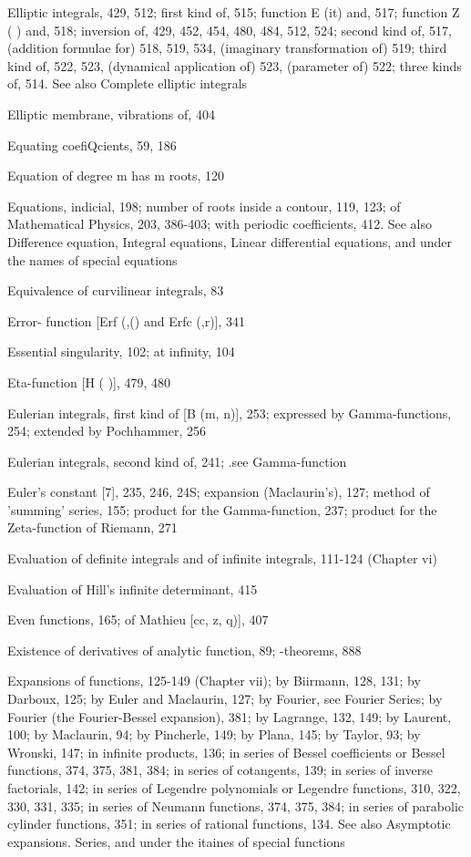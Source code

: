 %
%

Elliptic integrals, 429, 512; first kind of, 515; function E (it) and, 517; function Z ( ) and,
518; inversion of, 429, 452, 454, 480, 484, 512, 524; second kind of, 517, (addition formulae
for) 518, 519, 534, (imaginary transformation of) 519; third kind of, 522, 523, (dynamical
application of) 523, (parameter of) 522; three kinds of, 514. See also Complete elliptic
integrals

Elliptic membrane, vibrations of, 404

Equating coefiQcients, 59, 186

Equation of degree m has m roots, 120

Equations, indicial, 198; number of roots inside a contour, 119, 123; of Mathematical Physics,
203, 386-403; with periodic coefficients, 412. See also Difference equation, Integral
equations, Linear differential equations, and under the names of special equations

Equivalence of curvilinear integrals, 83

Error- function [Erf (,() and Erfc (,r)], 341

Essential singularity, 102; at infinity, 104

Eta-function [H ( )], 479, 480

Eulerian integrals, first kind of [B (m, n)], 253; expressed by Gamma-functions, 254; extended
by Pochhammer, 256

Eulerian integrals, second kind of, 241; .see Gamma-function

Euler's constant [7], 235, 246, 24S; expansion (Maclaurin's), 127; method of 'summing' series,
155; product for the Gamma-function, 237; product for the Zeta-function of Riemann, 271

Evaluation of definite integrals and of infinite integrals, 111-124 (Chapter vi)

Evaluation of Hill's infinite determinant, 415

Even functions, 165; of Mathieu [cc,  z, q)], 407

Existence of derivatives of analytic function, 89; -theorems, 888

Expansions of functions, 125-149 (Chapter vii); by Biirmann, 128, 131; by Darboux, 125; by
Euler and Maclaurin, 127; by Fourier, see Fourier Series; by Fourier (the Fourier-Bessel
expansion), 381; by Lagrange, 132, 149; by Laurent, 100; by Maclaurin, 94; by Pincherle,
149; by Plana, 145; by Taylor, 93; by Wronski, 147; in infinite products, 136; in series of
Bessel coefficients or Bessel functions, 374, 375, 381, 384; in series of cotangents, 139; in
series of inverse factorials, 142; in series of Legendre polynomials or Legendre functions,
310, 322, 330, 331, 335; in series of Neumann functions, 374, 375, 384; in series of parabolic
cylinder functions, 351; in series of rational functions, 134. See also Asymptotic expansions.
Series, and under the itaines of special functions

